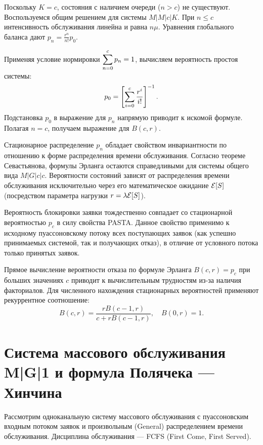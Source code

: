 \begin{sproof}
Поскольку $K = c$, состояния с наличием очереди ($n > c$) не существуют. Воспользуемся общим решением для системы $M|M|c|K$. При $n \le c$ интенсивность обслуживания линейна и равна $n\mu$. Уравнения глобального баланса дают $p_n = \frac{r^n}{n!} p_0$. 

Применяя условие нормировки $\displaystyle \sum_{n=0}^c p_n = 1$, вычисляем вероятность простоя системы:
$$
p_0 = \left[ \displaystyle \sum_{i=0}^c \frac{r^i}{i!} \right]^{-1}.
$$
Подстановка $p_0$ в выражение для $p_n$ напрямую приводит к искомой формуле. Полагая $n = c$, получаем выражение для $B(c, r)$.
\end{sproof}

\begin{note}[1]
    Стационарное распределение $p_n$ обладает свойством инвариантности по отношению к форме распределения времени обслуживания. Согласно теореме Севастьянова, формулы Эрланга остаются справедливыми для системы общего вида $M|G|c|c$. Вероятности состояний зависят от распределения времени обслуживания исключительно через его математическое ожидание $\mathcal{E}[S]$ (посредством параметра нагрузки $r = \lambda \mathcal{E}[S]$).
\end{note}    

\begin{note}[2]
    Вероятность блокировки заявки тождественно совпадает со стационарной вероятностью $p_c$ в силу свойства PASTA. Данное свойство применимо к исходному пуассоновскому потоку всех поступающих заявок (как успешно принимаемых системой, так и получающих отказ), в отличие от условного потока только принятых заявок.
\end{note}

\begin{note}[3]
    Прямое вычисление вероятности отказа по формуле Эрланга $B(c, r) = p_c$ при больших значениях $c$ приводит к вычислительным трудностям из-за наличия факториалов. Для численного нахождения стационарных вероятностей применяют рекуррентное соотношение:
    $$
    B(c, r) = \frac{r B(c-1, r)}{c + r B(c-1, r)}, \quad B(0, r) = 1.
    $$
\end{note}

\section{Система массового обслуживания M|G|1 и формула Полячека — Хинчина}

Рассмотрим одноканальную систему массового обслуживания с пуассоновским входным потоком заявок и произвольным (General) распределением времени обслуживания. Дисциплина обслуживания — FCFS (First Come, First Served). 

